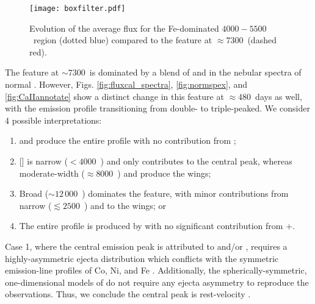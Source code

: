 \documentclass[twocolumn]{aastex63}
\begin{document}
\begin{figure}
    \centering
    \texttt{[image: boxfilter.pdf]}
    \caption{Evolution of the average flux for the Fe-dominated $4000-5500$~\AAA region (dotted blue) compared to the feature at $\approx 7300$~\AAA (dashed red).}
    \label{fig:boxfilter}
\end{figure}


The feature at $\sim 7300$~\AAA is dominated by a blend of  and  in the nebular spectra of normal \sneia \citep[e.g., ][]{mazzali2015, maguire2018, flors2018, wilk2020}. However, Figs. \ref{fig:fluxcal_spectra}, \ref{fig:normspex}, and \ref{fig:CaIIannotate} show a distinct change in this feature at $\approx 480$~days as well, with the emission profile transitioning from double- to triple-peaked. We consider 4 possible interpretations:

\begin{enumerate}
    \item {} and  produce the entire profile with no contribution from \CaII;
    \item {}[] is narrow ($<4000$~\kms) and only contributes to the central peak, whereas moderate-width ($\approx 8000$~\kms)  and  produce the wings;
    \item Broad \CaII ($\sim 12\,000$~\kms) dominates the feature, with minor contributions from narrow ($\lesssim 2500$~\kms)  and  to the wings; or
    \item The entire profile is produced by \CaII with no significant contribution from +.
\end{enumerate}

Case 1, where the central emission peak is attributed to  and/or , requires a highly-asymmetric ejecta distribution which conflicts with the symmetric emission-line profiles of Co, Ni, and Fe \citep[e.g., ][]{mcclelland2013, graham2015a}. Additionally, the spherically-symmetric, one-dimensional models of \citet{fransson2015} do not require any ejecta asymmetry to reproduce the observations. Thus, we conclude the central peak is rest-velocity \CaII.
\end{document}

